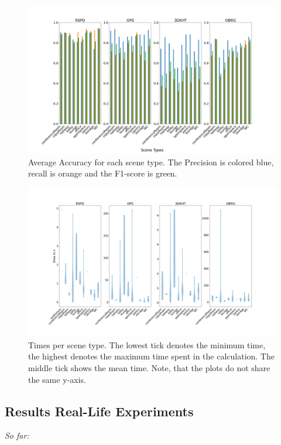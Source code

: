 \documentclass[main.tex]{subfiles}
\begin{document}
\begin{figure}[H]
    \centering
    \includegraphics[width=\textwidth]{images/accuracy_total.png}
    \caption[Accuracy Results 2D-3D-S]{Average Accuracy for each scene type. The Precision
        is colored blue, recall is orange and the F1-score is green.}
    \label{fig:stanfordaccuracy}
\end{figure}

\begin{figure}[H]
    \centering
    \includegraphics[width=15 cm]{images/times_violin.png}
    \caption[Time Results 2D-3D-S]{Times per scene type. The lowest tick denotes the minimum time, the highest
        denotes the maximum time spent in the calculation. The middle tick shows the mean time.
        Note, that the plots
        do not share the same y-axis.}
    \label{fig:violintime}
\end{figure}

\subsection{Results Real-Life Experiments}
\textit{So far:}
\end{document}
